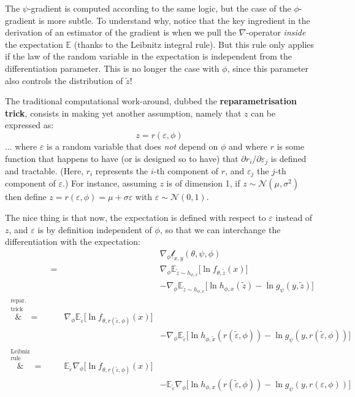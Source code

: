 \documentclass{article}
\begin{document}
\begin{appendix}
\begin{multicols}{2}
The $\psi$-gradient is computed according to the same logic, but the case of the $\phi$-gradient is more subtle. To understand why, notice that the key ingredient in the derivation of an estimator of the gradient is when we pull the $\nabla$-operator \textit{inside} the expectation $\mathbb{E}$ (thanks to the Leibnitz integral rule). But this rule only applies if the law of the random variable in the expectation is independent from the differentiation parameter. This is no longer the case with $\phi$, since this parameter also controls the distribution of $\tilde z$!

The traditional computational work-around, dubbed the \textbf{reparametrisation trick}, consists in making yet another assumption, namely that $z$ can be expressed as:
$$z=r(\varepsilon, \phi)$$
... where $\varepsilon$ is a random variable that does \textit{not} depend on $\phi$ and where $r$ is some function that happens to have (or is designed so to have) that $\partial r_i / \partial \varepsilon_j$ is defined and tractable. (Here, $r_i$ represents the $i$-th component of $r$, and $\varepsilon_j$ the $j$-th component of $\varepsilon$.) For instance, assuming $z$ is of dimension 1, if $z\sim \mathcal{N}(\mu,\sigma^2)$ then define $z=r(\varepsilon, \phi)=\mu+\sigma \varepsilon$ with $\varepsilon\sim\mathcal{N}(0,1)$.

The nice thing is that now, the expectation is defined with respect to $\varepsilon$ instead of $z$, and $\varepsilon$ is by definition independent of $\phi$, so that we can interchange the differentiation with the expectation:
\begin{align*}
& && \nabla_\phi\underline{\mathscr{l}}_{x,y}(\theta,\psi,\phi) \\
& = && \nabla_\phi \mathbb{E}_{\tilde z\sim h_{\phi,x}} \big[ \ln f_{\theta,\tilde z}(x) \big] \\
& && - \nabla_\phi \mathbb{E}_{\tilde z\sim h_{\phi,x}}\Big[\ln h_{\phi,x}(\tilde z) - \ln g_\psi(y,\tilde z)  \Big] \\
\overset{\substack{\text{repar.}\\ \text{trick}}}&{=} && \nabla_\phi \mathbb{E}_{\tilde \varepsilon} \big[ \ln f_{\theta,r(\tilde \varepsilon,\phi)}(x) \big] \\
& && - \nabla_\phi \mathbb{E}_{\tilde \varepsilon}\Big[\ln h_{\phi,\tilde x}(r(\tilde \varepsilon,\phi)) - \ln g_\psi(y,r(\tilde \varepsilon,\phi))  \Big] \\
\overset{\substack{\text{Leibniz}\\ \text{rule}}}&{=} && \mathbb{E}_{\tilde \varepsilon} \nabla_\phi \big[ \ln f_{\theta,r(\tilde \varepsilon,\phi)}(x) \big] \\
& && - \mathbb{E}_{\tilde \varepsilon} \nabla_\phi \Big[\ln h_{\phi,x}(r(\tilde \varepsilon,\phi)) - \ln g_\psi(y,r(\varepsilon,\phi))  \Big]
\end{align*}


\end{multicols}
\end{appendix}
\end{document}
